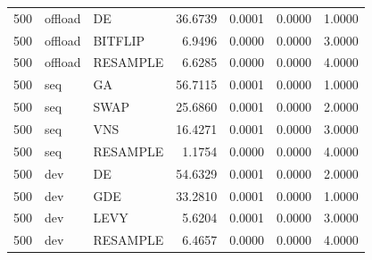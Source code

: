 \begin{tabular}{rllrrrr}
500 & offload & DE & 36.6739 & 0.0001 & 0.0000 & 1.0000 \\
500 & offload & BITFLIP & 6.9496 & 0.0000 & 0.0000 & 3.0000 \\
500 & offload & RESAMPLE & 6.6285 & 0.0000 & 0.0000 & 4.0000 \\
500 & seq & GA & 56.7115 & 0.0001 & 0.0000 & 1.0000 \\
500 & seq & SWAP & 25.6860 & 0.0001 & 0.0000 & 2.0000 \\
500 & seq & VNS & 16.4271 & 0.0001 & 0.0000 & 3.0000 \\
500 & seq & RESAMPLE & 1.1754 & 0.0000 & 0.0000 & 4.0000 \\
500 & dev & DE & 54.6329 & 0.0001 & 0.0000 & 2.0000 \\
500 & dev & GDE & 33.2810 & 0.0001 & 0.0000 & 1.0000 \\
500 & dev & LEVY & 5.6204 & 0.0001 & 0.0000 & 3.0000 \\
500 & dev & RESAMPLE & 6.4657 & 0.0000 & 0.0000 & 4.0000 \\
\bottomrule
\end{tabular}

